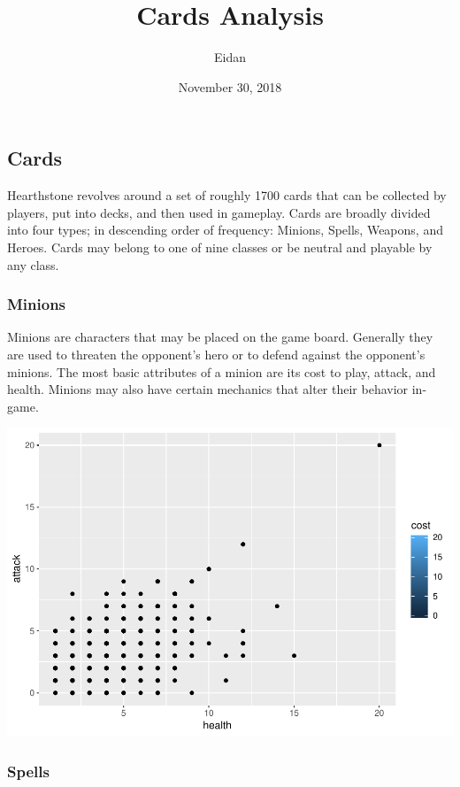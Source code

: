 \documentclass[]{article}
\title{Cards Analysis}
\author{Eidan}
\date{November 30, 2018}
\begin{document}
\maketitle

\subsection{Cards}\label{cards}

Hearthstone revolves around a set of roughly 1700 cards that can be
collected by players, put into decks, and then used in gameplay. Cards
are broadly divided into four types; in descending order of frequency:
Minions, Spells, Weapons, and Heroes. Cards may belong to one of nine
classes or be neutral and playable by any class.

\subsubsection{Minions}\label{minions}

Minions are characters that may be placed on the game board. Generally
they are used to threaten the opponent's hero or to defend against the
opponent's minions. The most basic attributes of a minion are its cost
to play, attack, and health. Minions may also have certain mechanics
that alter their behavior in-game.

\includegraphics{cardsAnalysis_files/figure-latex/minions-plots-1.pdf}

\subsubsection{Spells}\label{spells}
\end{document}

